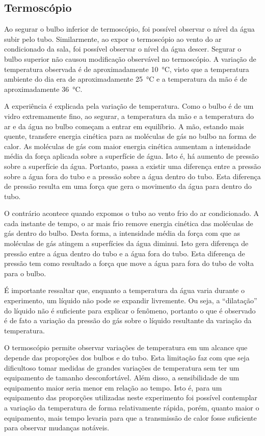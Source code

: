 \subsection{Termoscópio}

Ao segurar o bulbo inferior de termoscópio, foi possível observar o nível da água subir pelo tubo. Similarmente, ao expor o termoscópio ao vento do ar condicionado da sala, foi possível observar o nível da água descer. Segurar o bulbo superior não causou modificação observável no termoscópio. A variação de temperatura observada é de aproximadamente \qty{10}{\celsius}, visto que a temperatura ambiente do dia era de aproximadamente \qty{25}{\celsius} e a temperatura da mão é de aproximadamente \qty{36}{\celsius}.  

A experiência é explicada pela variação de temperatura. Como o bulbo é de um vidro extremamente fino, ao segurar, a temperatura da mão e a temperatura do ar e da água no bulbo começam a entrar em equilíbrio. A mão, estando mais quente, transfere energia cinética para as moléculas de gás no bulbo na forma de calor. As moléculas de gás com maior energia cinética aumentam a intensidade média da força aplicada sobre a superfície de água. Isto é, há aumento de pressão sobre a superfície da água. Portanto, passa a existir uma diferença entre a pressão sobre a água fora do tubo e a pressão sobre a água dentro do tubo. Esta diferença de pressão resulta em uma força que gera o movimento da água para dentro do tubo. 

O contrário acontece quando expomos o tubo ao vento frio do ar condicionado. A cada instante de tempo, o ar mais frio remove energia cinética das moléculas de gás dentro do bulbo. Desta forma, a intensidade média da força com que as moléculas de gás atingem a superfícies da água diminui. Isto gera diferença de pressão entre a água dentro do tubo e a água fora do tubo. Esta diferença de pressão  tem como resultado a força que move a água para fora do tubo de volta para o bulbo.

É importante ressaltar que, enquanto a temperatura da água varia durante o experimento, um líquido não pode se expandir livremente. Ou seja, a ``dilatação'' do líquido não é suficiente para explicar o fenômeno, portanto o que é observado é de fato a variação da pressão do gás sobre o líquido resultante da variação da temperatura. 

O termoscópio permite observar variações de temperatura em um alcance que depende das proporções dos bulbos e do tubo. Esta limitação faz com que seja dificultoso tomar medidas de grandes variações de temperatura sem ter um equipamento de tamanho desconfortável. Além disso, a sensibilidade de um equipamento maior seria menor em relação ao tempo. Isto é, para um equipamento das proporções utilizadas neste experimento foi possível contemplar a variação da temperatura de forma relativamente rápida, porém, quanto maior o equipamento, mais tempo levaria para que a transmissão de calor fosse suficiente para observar mudanças notáveis. 

